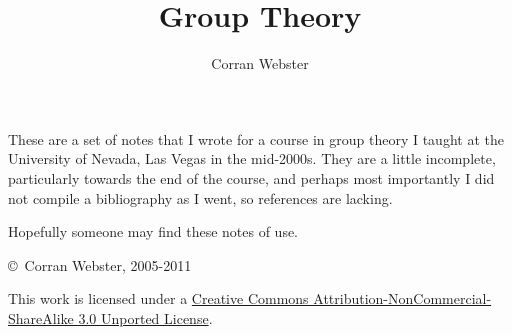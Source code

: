 \documentclass[10pt]{book}
\title{Group Theory}
\author{Corran Webster}
\theoremstyle{break}
\begin{document}
\maketitle
{}

These are a set of notes that I wrote for a course in group theory I taught at
the University of Nevada, Las Vegas in the mid-2000s.  They are a little
incomplete, particularly towards the end of the course, and perhaps most
importantly I did not compile a bibliography as I went, so references are
lacking.

Hopefully someone may find these notes of use.

\bigskip

\noindent \copyright\ Corran Webster, 2005-2011

\medskip

\noindent This work is licensed under a
\href{http://creativecommons.org/licenses/by-nc-sa/3.0/}{Creative Commons
Attribution-NonCommercial-ShareAlike 3.0 Unported License}.


\tableofcontents

\newpage


\pagestyle{draft}









\printindex
\end{document}
